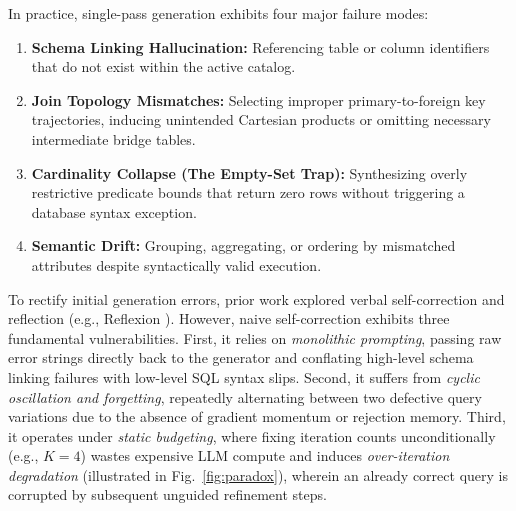 \documentclass[conference]{IEEEtran}
\begin{document}
In practice, single-pass generation exhibits four major failure modes:
\begin{enumerate}
    \item \textbf{Schema Linking Hallucination:} Referencing table or column identifiers that do not exist within the active catalog.
    \item \textbf{Join Topology Mismatches:} Selecting improper primary-to-foreign key trajectories, inducing unintended Cartesian products or omitting necessary intermediate bridge tables.
    \item \textbf{Cardinality Collapse (The Empty-Set Trap):} Synthesizing overly restrictive predicate bounds that return zero rows without triggering a database syntax exception.
    \item \textbf{Semantic Drift:} Grouping, aggregating, or ordering by mismatched attributes despite syntactically valid execution.
\end{enumerate}

To rectify initial generation errors, prior work explored verbal self-correction and reflection (e.g., Reflexion \cite{shinn2023reflexion}). However, naive self-correction exhibits three fundamental vulnerabilities. First, it relies on \textit{monolithic prompting}, passing raw error strings directly back to the generator and conflating high-level schema linking failures with low-level SQL syntax slips. Second, it suffers from \textit{cyclic oscillation and forgetting}, repeatedly alternating between two defective query variations due to the absence of gradient momentum or rejection memory. Third, it operates under \textit{static budgeting}, where fixing iteration counts unconditionally (e.g., $K=4$) wastes expensive LLM compute and induces \textit{over-iteration degradation} (illustrated in Fig.~\ref{fig:paradox}), wherein an already correct query is corrupted by subsequent unguided refinement steps.
\end{document}
